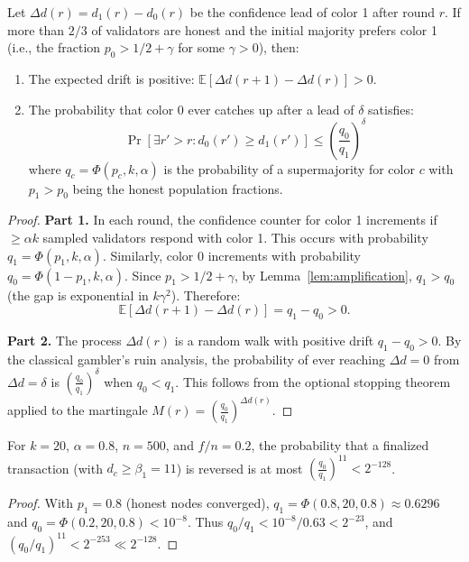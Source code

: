 \begin{theorem}
\label{thm:monotonicity}
Let $\Delta d(r) = d_1(r) - d_0(r)$ be the confidence lead of color 1 after round $r$.
If more than $2/3$ of validators are honest and the initial majority prefers color 1
(i.e., the fraction $p_0 > 1/2 + \gamma$ for some $\gamma > 0$), then:
\begin{enumerate}[nosep]
\item The expected drift is positive: $\mathbb{E}[\Delta d(r+1) - \Delta d(r)] > 0$.
\item The probability that color 0 ever catches up after a lead of $\delta$ satisfies:
\[
\Pr[\exists r' > r : d_0(r') \geq d_1(r')] \leq \left(\frac{q_0}{q_1}\right)^\delta
\]
where $q_c = \Phi(p_c, k, \alpha)$ is the probability of a supermajority for color $c$
with $p_1 > p_0$ being the honest population fractions.
\end{enumerate}
\end{theorem}

\begin{proof}
\textbf{Part 1.} In each round, the confidence counter for color 1 increments if
$\geq \alpha k$ sampled validators respond with color 1. This occurs with probability
$q_1 = \Phi(p_1, k, \alpha)$. Similarly, color 0 increments with probability
$q_0 = \Phi(1 - p_1, k, \alpha)$. Since $p_1 > 1/2 + \gamma$, by Lemma~\ref{lem:amplification},
$q_1 > q_0$ (the gap is exponential in $k\gamma^2$). Therefore:
\[
\mathbb{E}[\Delta d(r+1) - \Delta d(r)] = q_1 - q_0 > 0.
\]

\textbf{Part 2.} The process $\Delta d(r)$ is a random walk with positive drift $q_1 - q_0 > 0$.
By the classical gambler's ruin analysis, the probability of ever reaching $\Delta d = 0$
from $\Delta d = \delta$ is $\left(\frac{q_0}{q_1}\right)^\delta$ when $q_0 < q_1$.
This follows from the optional stopping theorem applied to the martingale
$M(r) = \left(\frac{q_0}{q_1}\right)^{\Delta d(r)}$.
\end{proof}

\begin{corollary}
\label{cor:safety}
For $k = 20$, $\alpha = 0.8$, $n = 500$, and $f/n = 0.2$, the probability that a
finalized transaction (with $d_c \geq \beta_1 = 11$) is reversed is at most
$\left(\frac{q_0}{q_1}\right)^{11} < 2^{-128}$.
\end{corollary}

\begin{proof}
With $p_1 = 0.8$ (honest nodes converged), $q_1 = \Phi(0.8, 20, 0.8) \approx 0.6296$ and
$q_0 = \Phi(0.2, 20, 0.8) < 10^{-8}$. Thus $q_0/q_1 < 10^{-8}/0.63 < 2^{-23}$, and
$(q_0/q_1)^{11} < 2^{-253} \ll 2^{-128}$.
\end{proof}


